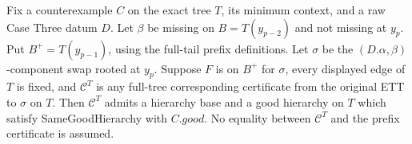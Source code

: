 \begin{lemma}
Fix a counterexample $C$ on the exact tree $T$, its minimum context,
and a raw Case Three datum $D$. Let $\beta$ be missing on
$B=T(y_{p-2})$ and not missing at $y_p$. Put
$B^+=T(y_{p-1})$, using the full-tail prefix definitions.
Let $\sigma$ be the $(D.\alpha,\beta)$-component swap rooted at $y_p$.
Suppose $F$ is  on $B^+$ for $\sigma$,
every displayed edge of $T$ is fixed, and $\mathcal C^T$ is any
full-tree corresponding certificate from the original ETT to $\sigma$
on $T$. Then $\mathcal C^T$ admits a hierarchy base and a good hierarchy
on $T$ which satisfy SameGoodHierarchy with $C.\mathit{good}$.
No equality between $\mathcal C^T$ and the prefix certificate is assumed.
\end{lemma}
